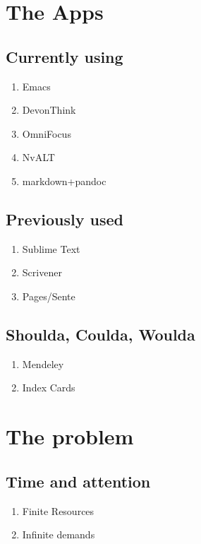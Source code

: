 \documentclass[11pt]{article}
\begin{document}
\section{The Apps}
\label{sec-3}
\subsection{Currently using}
\label{sec-3-1}
\begin{enumerate}
\item Emacs
\item DevonThink
\item OmniFocus
\item NvALT
\item markdown+pandoc
\end{enumerate}
\subsection{Previously used}
\label{sec-3-2}
\begin{enumerate}
\item Sublime Text
\item Scrivener
\item Pages/Sente
\end{enumerate}
\subsection{Shoulda, Coulda, Woulda}
\label{sec-3-3}
\begin{enumerate}
\item Mendeley
\item Index Cards
\end{enumerate}




\section{The problem}
\label{sec-4}
\subsection{Time and attention}
\label{sec-4-1}
\begin{enumerate}
\item Finite Resources
\label{sec-4-1-1}
\item Infinite demands
\label{sec-4-1-2}
\end{enumerate}
\end{document}
